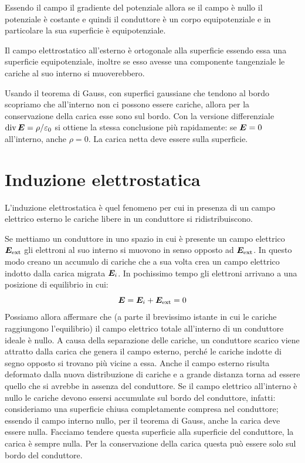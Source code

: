 Essendo il campo il gradiente del potenziale allora se il campo è nullo il potenziale è costante e quindi il conduttore è un corpo equipotenziale e in particolare la sua superficie è equipotenziale.

Il campo elettrostatico all'esterno è ortogonale alla superficie essendo essa una superficie equipotenziale, inoltre se esso avesse una componente tangenziale le cariche al suo interno si muoverebbero.

Usando il teorema di Gauss, con superfici gaussiane che tendono al bordo scopriamo che all'interno non ci possono essere cariche, allora per la conservazione della carica esse sono sul bordo. Con la versione differenziale $\operatorname{div}\boldsymbol{E}=\rho/\varepsilon_0$ si ottiene la stessa conclusione più rapidamente: se $\boldsymbol{E}=0$ all'interno, anche $\rho=0$. La carica netta deve essere sulla superficie.
\section{Induzione elettrostatica}
\begin{Def}
  L'induzione elettrostatica è quel fenomeno per cui in presenza di un campo elettrico esterno le cariche libere in un conduttore si ridistribuiscono.
\end{Def}
Se mettiamo un conduttore in uno spazio in cui è presente un campo elettrico $\boldsymbol{E}_\text{ext}$ gli elettroni al suo interno si muovono in senso opposto ad $\boldsymbol{E}_\text{ext}$. In questo modo creano un accumulo di cariche che a sua volta crea un campo elettrico indotto dalla carica migrata $\boldsymbol{E}_i$. In pochissimo tempo gli elettroni arrivano a una posizione di equilibrio in cui:
\[\boldsymbol{E}=\boldsymbol{E}_i+\boldsymbol{E}_\text{ext}=0\]
Possiamo allora affermare che (a parte il brevissimo istante in cui le cariche raggiungono l'equilibrio) il campo elettrico totale all'interno di un conduttore ideale è nullo. A causa della separazione delle cariche, un conduttore scarico viene attratto dalla carica che genera il campo esterno, perché le cariche indotte di segno opposto si trovano più vicine a essa. Anche il campo esterno risulta deformato dalla nuova distribuzione di cariche e a grande distanza torna ad essere quello che si avrebbe in assenza del conduttore. Se il campo elettrico all'interno è nullo le cariche devono essersi accumulate sul bordo del conduttore, infatti:
consideriamo una superficie chiusa completamente compresa nel conduttore; essendo il campo interno nullo, per il teorema di Gauss, anche la carica deve essere nulla. Facciamo tendere questa superficie alla superficie del conduttore, la carica è sempre nulla. Per la conservazione della carica questa può essere solo sul bordo del conduttore.

